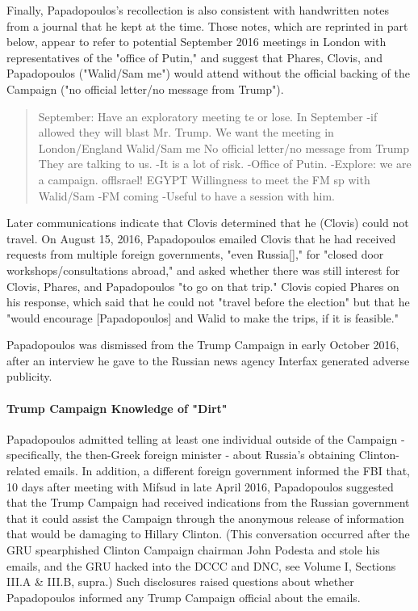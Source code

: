 Finally, Papadopoulos's recollection is also consistent with handwritten notes from a journal that he kept at the time.%
Those notes, which are reprinted in part below, appear to refer to potential September 2016 meetings in London with representatives of the "office of Putin," and suggest that Phares, Clovis, and Papadopoulos ("Walid/Sam me") would attend without the official backing of the Campaign ("no official letter/no message from Trump").%


\begin{quote}
September: Have an exploratory meeting te or lose. In September -if allowed they will blast Mr. Trump. We want the meeting in London/England Walid/Sam me No official letter/no message from Trump They are talking to us. -It is a lot of risk. -Office of Putin. -Explore: we are a campaign. offlsrael! EGYPT Willingness to meet the FM sp with Walid/Sam -FM coming -Useful to have a session with him.
\end{quote}

Later communications indicate that Clovis determined that he (Clovis) could not travel.
On August 15, 2016, Papadopoulos emailed Clovis that he had received requests from multiple foreign governments, "even Russia[]," for "closed door workshops/consultations abroad," and asked whether there was still interest for Clovis, Phares, and Papadopoulos "to go on that trip."%
Clovis copied Phares on his response, which said that he could not "travel before the election" but that he "would encourage [Papadopoulos] and Walid to make the trips, if it is feasible."%

Papadopoulos was dismissed from the Trump Campaign in early October 2016, after an interview he gave to the Russian news agency Interfax generated adverse publicity.%

\paragraph{Trump Campaign Knowledge of "Dirt"}

Papadopoulos admitted telling at least one individual outside of the Campaign - specifically, the then-Greek foreign minister - about Russia's obtaining Clinton-related emails.%
In addition, a different foreign government informed the FBI that, 10 days after meeting with Mifsud in late April 2016, Papadopoulos suggested that the Trump Campaign had received indications from the Russian government that it could assist the Campaign through the anonymous release of information that would be damaging to Hillary Clinton.%
(This conversation occurred after the GRU spearphished Clinton Campaign chairman John Podesta and stole his emails, and the GRU hacked into the DCCC and DNC, see Volume I, Sections III.A \& III.B, supra.)
Such disclosures raised questions about whether Papadopoulos informed any Trump Campaign official about the emails.


